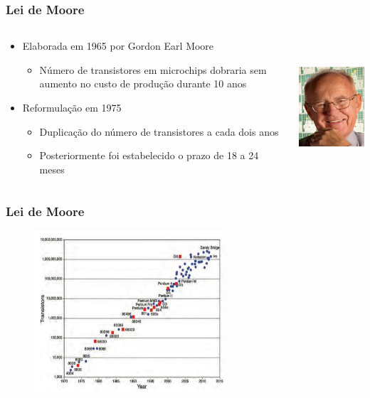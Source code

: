 \documentclass[aspectratio=169,
				xcolor=table]{beamer}
\begin{document}
	\begin{frame}
		\frametitle{Lei de Moore}
		\begin{columns}
			\begin{column}{0.7\textwidth}
				\begin{itemize}
					\item Elaborada em 1965 por Gordon Earl Moore
					\begin{itemize}
						\item Número de transistores em microchips dobraria sem aumento no custo de produção durante 10 anos
					\end{itemize}
					\vspace{1em}
					\item Reformulação em 1975
					\begin{itemize}
						\item Duplicação do número de transistores a cada dois anos
						\item Posteriormente foi estabelecido o prazo de 18 a 24 meses 
					\end{itemize}
				\end{itemize}
			\end{column}
			\begin{column}{0.3\textwidth}
					\centering
				\includegraphics[height=5cm, keepaspectratio]{../figs/cap03/moore.png} 
			\end{column}
		\end{columns}
	\end{frame}
	
	\begin{frame}
		\frametitle{Lei de Moore}
		\begin{figure}
					\centering
			\includegraphics[height=6cm, keepaspectratio]{../figs/cap03/mooregrafico.png} 
		
		\end{figure}
	\end{frame}
\end{document}
